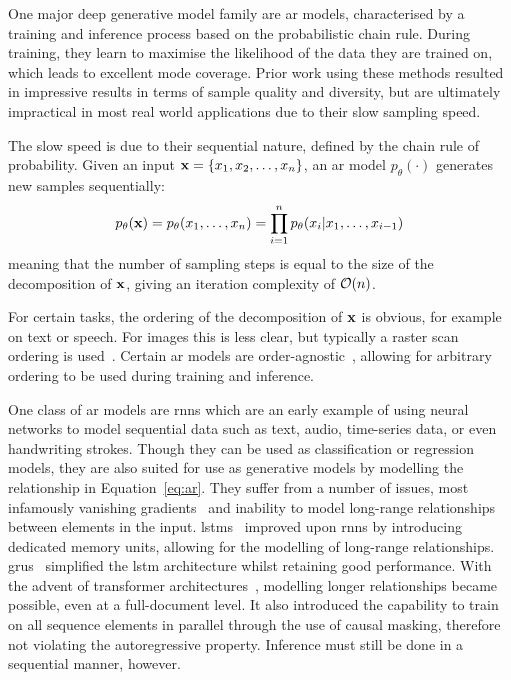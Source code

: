 One major deep generative model family are \acrfull{ar} models, characterised by
a training and inference process based on the probabilistic chain rule. During
training, they learn to maximise the likelihood of the data they are trained on,
which leads to excellent mode coverage. Prior work using these methods resulted
in impressive results in terms of sample quality and diversity, but are
ultimately impractical in most real world applications due to their slow
sampling speed.

The slow speed is due to their sequential nature, defined by the chain
rule of probability. Given an input $\mathbf{x} = \{ x_{1}, x_{2}, \dots,
x_{n} \}$, an \gls{ar} model $p_\theta(\cdot)$ generates new
samples sequentially:
\begin{equation}\label{eq:ar}
    p_\theta(\mathbf{x}) = p_\theta(x_{1}, \dots, x_{n}) =
    \prod\limits^{n}_{i=1} p_\theta(x_{i} \vert x_{1}, \dots, x_{i-1})
\end{equation}
meaning that the number of sampling steps is equal to the size of the
decomposition of $\mathbf{x}$, giving an iteration complexity of $\mathcal{O}(n)$.

For certain tasks, the ordering of the decomposition of $\mathbf{x}$ is obvious, for
example on text or speech. For images this is less clear, but typically a raster
scan ordering is used~\cite{parmar2018image}. Certain \gls{ar} models are
order-agnostic~\cite{hoogeboom2021autoregressive}, allowing for arbitrary
ordering to be used during training and inference.

One class of \gls{ar} models are \glspl{rnn} which are an early example of using
neural networks to model sequential data such as text, audio, time-series data,
or even handwriting strokes. Though they can be used as classification or
regression models, they are also suited for use as generative models by
modelling the relationship in Equation~\ref{eq:ar}. They suffer from a number of
issues, most infamously vanishing gradients~\cite{pascanu2012rnn} and inability
to model long-range relationships between elements in the input.
\Glspl{lstm}~\cite{hoch1997lstm} improved upon \glspl{rnn} by introducing
dedicated memory units, allowing for the modelling of long-range
relationships. \Glspl{gru}~\cite{cho2014gru} simplified the \gls{lstm}
architecture whilst retaining good performance. With the advent of transformer
architectures~\cite{vaswani2017attention}, modelling longer relationships became
possible, even at a full-document level. It also introduced the capability to
train on all sequence elements in parallel through the use of causal masking,
therefore not violating the autoregressive property. Inference must still be
done in a sequential manner, however.

